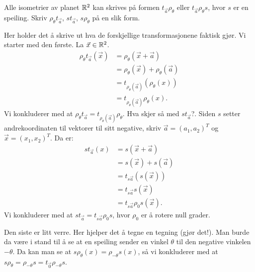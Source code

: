 \documentclass[11pt, norsk]{article}
\begin{document}
\begin{oppg}
  Alle isometrier av planet $\mathbb{R}^2$ kan skrives på formen $t_{\vec a} \rho_\theta$ eller $t_{\vec a}\rho_{\theta}s$, hvor $s$ er en speiling. Skriv $\rho_\theta t_{\vec a}$, $st_{\vec a}$, $s\rho_\theta$ på en slik form.
\end{oppg}
\begin{losn}
Her holder det å skrive ut hva de forskjellige transformasjonene faktisk gjør. Vi starter med den første. La $\vec x \in \mathbb{R}^2$.
\begin{align*}
\rho_\theta t_{\vec a} (\vec x) &= \rho_\theta(\vec x + \vec a) \\
&= \rho_\theta(\vec x) + \rho_\theta(\vec a) \\
&= t_{\rho_\theta (\vec a)}(\rho_\theta(x)) \\
&= t_{\rho_\theta(\vec a)}\rho_\theta(x).
\end{align*}
Vi konkluderer med at $\rho_\theta t_{\vec a}=t_{\rho_\theta(\vec a)} \rho_\theta$. Hva skjer så med $s t_{\vec a}$?. Siden $s$ setter andrekoordinaten til vektorer til sitt negative, skriv $\vec a = (a_1,a_2)^T$ og $\vec x = (x_1,x_2)^T$. Da er:
\begin{align*}
 st_{\vec a}(x) &= s(\vec x +\vec a) \\
&= s(\vec x) + s(\vec a) \\
&= t_{s\vec a}(s (\vec x)) \\
&= t_{s \vec a}s (\vec x) \\
&= t_{s \vec a}\rho_0 s (\vec x).
\end{align*}
Vi konkluderer med at $st_{\vec a} = t_{s \vec a}\rho_0 s$, hvor $\rho_0$ er å rotere null grader. 

Den siste er litt verre. Her hjelper det å tegne en tegning (gjør det!). Man burde da være i stand til å se at en speiling sender en vinkel $\theta$ til den negative vinkelen $-\theta$. Da kan man se at $s\rho_\theta(x)=\rho_{-\theta}s(x)$, så vi konkluderer med at $s\rho_\theta = \rho_{-\theta}s = t_{\vec 0} \rho_{-\theta}s$.
\end{losn}
\end{document}
